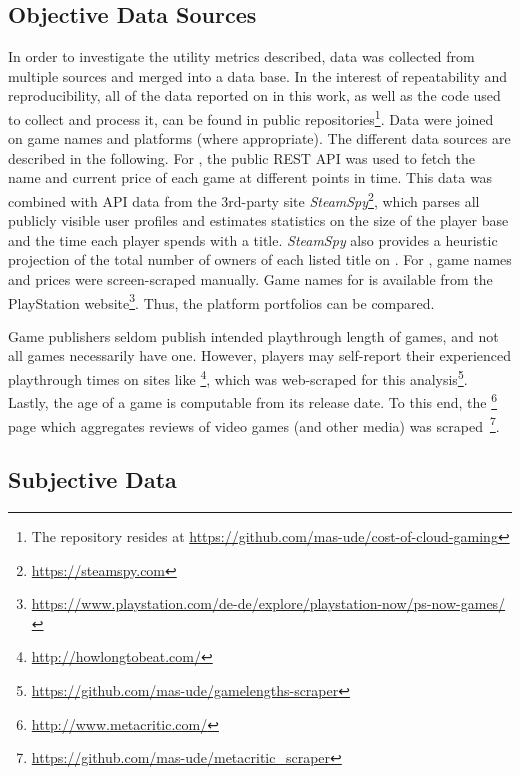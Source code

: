 \subsection{Objective Data Sources}
In order to investigate the utility metrics described, data was collected from
multiple sources and merged
into a data base. In the interest of repeatability and
reproducibility, all of the data reported on in this work, as well as
the code used to collect and process it, can be found in public
repositories\footnote{The repository resides at \url{https://github.com/mas-ude/cost-of-cloud-gaming}}.
Data were joined on game names and platforms (where appropriate).
The different data sources are described in the following.
For \steam, the public \acrshort{REST} \acrshort{API} was used to
fetch the name and current price of each game at different points in
time.
This data was combined with \acrshort{API} data from the 3rd-party site
\textit{SteamSpy}\footnote{\url{https://steamspy.com}}, which parses all
publicly visible \steam user profiles and
estimates statistics on the size of the player base and the time each
player spends with a title. \textit{SteamSpy} also provides a heuristic
projection of the total number of owners of each listed title on \steam.
For \gfnow, game names and prices were screen-scraped manually.
Game names for \psnow is available from the PlayStation
website\footnote{\url{https://www.playstation.com/de-de/explore/playstation-now/ps-now-games/}}.
Thus, the platform portfolios can be compared.

Game publishers seldom publish intended playthrough
length of games, and not all games necessarily have one. However, players
may self-report their experienced playthrough times on sites like
\hltb\footnote{\url{http://howlongtobeat.com/}}, which was web-scraped
for this analysis\footnote{\url{https://github.com/mas-ude/gamelengths-scraper}}.
Lastly, the age of a game is computable from its release date. To this end, the
\metacritic\footnote{\url{http://www.metacritic.com/}} page which
aggregates reviews of video games (and other media) was
scraped~\footnote{\url{https://github.com/mas-ude/metacritic_scraper}}.



\subsection{Subjective Data}

